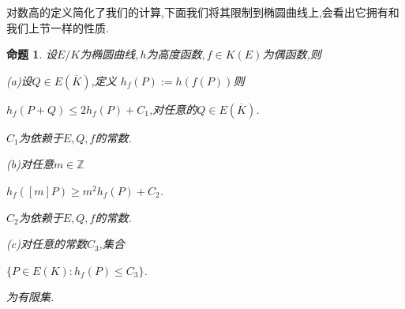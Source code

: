 \documentclass[11pt]{ctexart}
\newtheorem{pro}{命题}[section]
\begin{document}
对数高的定义简化了我们的计算,下面我们将其限制到椭圆曲线上,会看出它拥有和我们上节一样的性质.

\begin{pro}设$E/K$为椭圆曲线$,h$为高度函数$,f\in K(E)$为偶函数,则

    \noindent  (a)设$Q \in E(\overline{K})$,定义 $h_f(P):=h(f(P))$则
    \begin{center}
       $h_f(P+Q)\leq 2h_f(P)+C_1$,对任意的$Q\in E(\overline{K})$.
    \end{center}
    $C_1$为依赖于$E,Q,f$的常数.



   \noindent (b)对任意$m\in \mathbb{Z}$
    \begin{center}
        $h_f([m]P)\geq m^2h_f(P)+C_2$.
    \end{center}
    $C_2$为依赖于$E,Q,f$的常数.





    \noindent(c)对任意的常数$C_3$,集合
    \begin{center}
        $\{P\in E(K):h_f(P)\leq C_3\}$.
    \end{center}
    为有限集.



\end{pro}
\end{document}
